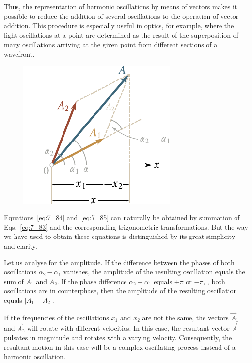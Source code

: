 Thus, the representation of harmonic oscillations by means of vectors makes it possible to reduce the addition of several oscillations to the operation of vector addition. This procedure is especially useful in optics, for example, where the light oscillations at a point are determined as the result of the superposition of many oscillations arriving at the given point from different sections of a wavefront.

\begin{figure}[t]
	\begin{center}
		\includegraphics[scale=0.95]{figures/ch_07/fig_7_10.pdf}
		\caption[]{}
		\label{fig:7_10}
	\end{center}
	\vspace{-0.5cm}
\end{figure}

Equations~\eqref{eq:7_84} and~\eqref{eq:7_85} can naturally be obtained by summation of Eqs.~\eqref{eq:7_83} and the corresponding trigonometric transformations. But the way we have used to obtain these equations is distinguished by its great simplicity and clarity.

Let us analyse  for the amplitude. If the difference between the phases of both oscillations $\alpha_2-\alpha_1$ vanishes, the amplitude of the resulting oscillation equals the sum of $A_1$ and $A_ 2$. If the phase difference $\alpha_2-\alpha_1$ equals $+\pi$ or $-\pi$, \ie, both oscillations are in counterphase, then the amplitude of the resulting oscillation equals $|A_1-A_2|$.

If the frequencies of the oscillations $x_1$ and $x_2$ are not the same, the vectors $\vec{A}_1$ and $\vec{A}_2$ will rotate with different velocities. In this case, the resultant vector $\vec{A}$ pulsates in magnitude and rotates with a varying velocity. Consequently, the resultant motion in this case will be a complex oscillating process instead of a harmonic oscillation.

